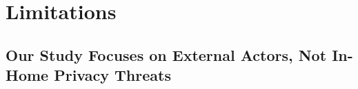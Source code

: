 \section{Limitations}
\label{sec:limitations}


\subsection{Our Study Focuses on External Actors, Not In-Home Privacy Threats}
